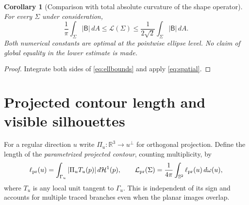 \documentclass[10pt,a4paper]{article}
\newtheorem{corollary}[theorem]{Corollary}
\theoremstyle{remark}\newtheorem{remark}[theorem]{Remark}
\newcommand{\Sph}{\mathbb S^2}
\newcommand{\HH}{\mathcal H}
\newcommand{\Lc}{\mathcal L}
\newcommand{\Lp}{\mathcal L_{\mathrm{pr}}}
\newcommand{\Bop}{\mathsf B}
\begin{document}
\begin{corollary}[Comparison with total absolute curvature of the shape operator]\label{cor:compare}
For every $\Sigma$ under consideration,
\begin{equation}\label{eq:comparison}
\boxed{\displaystyle
\frac1\pi\int_\Sigma|\Bop|\,dA
\leq\Lc(\Sigma)\leq
\frac1{2\sqrt2}\int_\Sigma|\Bop|\,dA.}
\end{equation}
Both numerical constants are optimal at the \emph{pointwise} ellipse level. No claim of global equality in the lower estimate is made.
\end{corollary}
\begin{proof}
Integrate both sides of \eqref{eq:ellbounds} and apply \eqref{eq:spatial}.
\end{proof}

\section{Projected contour length and visible silhouettes}
For a regular direction $u$ write $\Pi_u:\mathbb R^3\to u^\perp$ for orthogonal projection. Define the length of the \emph{parametrized projected contour}, counting multiplicity, by
\begin{equation}\label{eq:projecteddef}
\ell_{\rm pr}(u)=\int_{\Gamma_u}|\Pi_uT_u(p)|\,d\HH^1(p),
\qquad
\Lp(\Sigma)=\frac1{4\pi}\int_{\Sph}\ell_{\rm pr}(u)\,d\omega(u),
\end{equation}
where $T_u$ is any local unit tangent to $\Gamma_u$. This is independent of its sign and accounts for multiple traced branches even when the planar images overlap.
\end{document}
